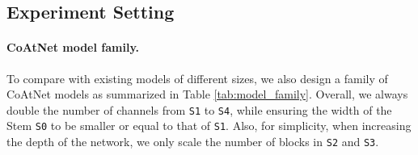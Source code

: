 \documentclass{article}
\newcommand{\name}{CoAtNet\xspace}
\begin{document}
\subsection{Experiment Setting}

\paragraph{\name model family.} To compare with existing models of different sizes, we also design a family of \name models as summarized in Table \ref{tab:model_family}.
Overall, we always double the number of channels from \texttt{S1} to \texttt{S4}, while ensuring the width of the Stem \texttt{S0} to be smaller or equal to that of \texttt{S1}.
Also, for simplicity, when increasing the depth of the network, we only scale the number of blocks in \texttt{S2} and \texttt{S3}.
\end{document}
